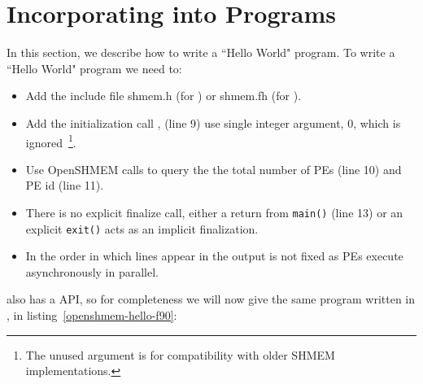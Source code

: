 \section*{Incorporating \openshmem{} into Programs}

In this section, we describe how to write a ``Hello World" \openshmem program.
To write a ``Hello World" \openshmem program we need to: 

\begin{itemize}
\item Add the include file shmem.h (for \Clang) or shmem.fh (for \Fortran).
\item Add the initialization call , (line 9) use
  single integer argument, 0, which is ignored~\footnote{The unused
    argument is for compatibility with older SHMEM implementations.}.
\item Use OpenSHMEM calls to query the the total number of PEs (line 10) and PE id (line 11).
\item There is no explicit finalize call, either a return from
  \texttt{main()} (line 13) or an explicit \texttt{exit()} acts as an
  implicit \openshmem finalization.
\item In \openshmem the order in which lines appear
  in the output is not fixed as \ac{PE}s execute asynchronously in parallel.
\end{itemize}

\begin{minipage}{\linewidth}
\vspace{0.1in}
\vspace{0.1in}
\end{minipage}

\openshmem also has a \Fortran{} API, so for completeness we will now give the
same program written in \Fortran, in listing~\ref{openshmem-hello-f90}:

\begin{minipage}{\linewidth}
\vspace{0.1in}
\vspace{0.1in}
\end{minipage}

